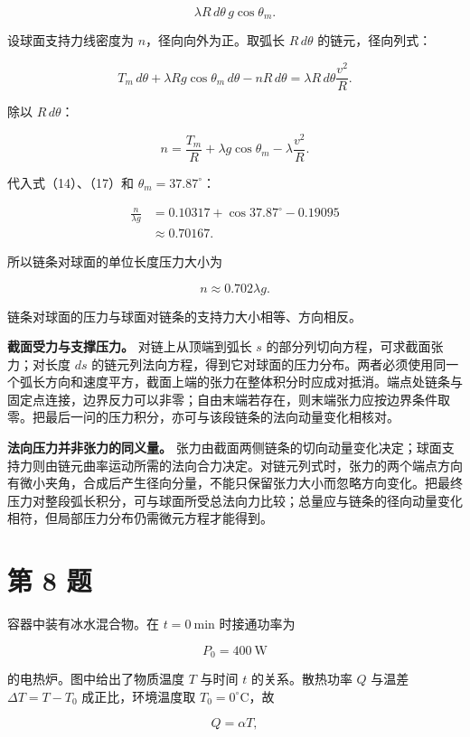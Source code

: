 \documentclass[12pt,a4paper,UTF8]{ctexart}
\begin{document}
\[
\lambda R\,d\theta\,g\cos\theta_m.
\]

设球面支持力线密度为 \(n\)，径向向外为正。取弧长 \(R\,d\theta\)
的链元，径向列式：

\[
T_m\,d\theta
+\lambda Rg\cos\theta_m\,d\theta
-nR\,d\theta
=\lambda R\,d\theta\frac{v^2}{R}.
\]

除以 \(R\,d\theta\)：

\[
n=\frac{T_m}{R}+\lambda g\cos\theta_m-\lambda\frac{v^2}{R}.
\tag{18}
\]

代入式（14）、（17）和 \(\theta_m=37.87^\circ\)：

\[
\begin{aligned}
\frac{n}{\lambda g}
&=0.10317+\cos37.87^\circ-0.19095\\
&\approx0.70167.
\end{aligned}
\]

所以链条对球面的单位长度压力大小为

\[
\boxed{n\approx0.702\lambda g}.
\tag{19}
\]

链条对球面的压力与球面对链条的支持力大小相等、方向相反。

\textbf{截面受力与支撑压力。} 对链上从顶端到弧长 \(s\)
的部分列切向方程，可求截面张力；对长度 \(ds\)
的链元列法向方程，得到它对球面的压力分布。两者必须使用同一个弧长方向和速度平方，截面上端的张力在整体积分时应成对抵消。端点处链条与固定点连接，边界反力可以非零；自由末端若存在，则末端张力应按边界条件取零。把最后一问的压力积分，亦可与该段链条的法向动量变化相核对。

\textbf{法向压力并非张力的同义量。}
张力由截面两侧链条的切向动量变化决定；球面支持力则由链元曲率运动所需的法向合力决定。对链元列式时，张力的两个端点方向有微小夹角，合成后产生径向分量，不能只保留张力大小而忽略方向变化。把最终压力对整段弧长积分，可与球面所受总法向力比较；总量应与链条的径向动量变化相符，但局部压力分布仍需微元方程才能得到。

\newpage

\section{第 8 题}\label{ux7b2c-8-ux9898}

容器中装有冰水混合物。在 \(t=0\ \mathrm{min}\) 时接通功率为

\[
P_0=400\ \mathrm W
\]

的电热炉。图中给出了物质温度 \(T\) 与时间 \(t\) 的关系。散热功率 \(Q\)
与温差 \(\Delta T=T-T_0\) 成正比，环境温度取
\(T_0=0^\circ\mathrm C\)，故

\[
Q=\alpha T,
\]
\end{document}
